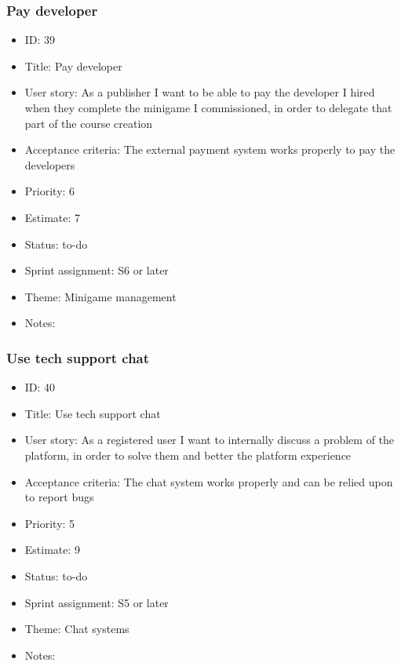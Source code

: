 \subsubsection{Pay developer}
\begin{itemize}
	\item ID: 39
	\item Title: Pay developer
	\item User story: As a publisher I want to be able to pay the developer I hired when they complete the minigame I commissioned, in order to delegate that part of the course creation
	\item Acceptance criteria: The external payment system works properly to pay the developers
	\item Priority: 6
	\item Estimate: 7
	\item Status: to-do
	\item Sprint assignment: S6 or later
	\item Theme: Minigame management
	\item Notes:
\end{itemize}

\subsubsection{Use tech support chat}
\begin{itemize}
	\item ID: 40
	\item Title: Use tech support chat
	\item User story: As a registered user I want to internally discuss a problem of the platform, in order to solve them and better the platform experience
	\item Acceptance criteria: The chat system works properly and can be relied upon to report bugs
	\item Priority: 5
	\item Estimate: 9
	\item Status: to-do
	\item Sprint assignment: S5 or later
	\item Theme: Chat systems
	\item Notes:
\end{itemize}

